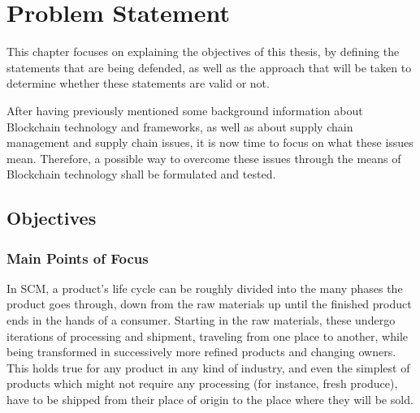 \chapter{Problem Statement}
\label{chap:supply-chain-problems}
\minitoc \mtcskip \noindent 

This chapter focuses on explaining the objectives of this thesis, by defining the statements that are being defended, as well as the approach that will be taken to determine whether these statements are valid or not.


After having previously mentioned some background information about Blockchain technology and frameworks, as well as about supply chain management and supply chain issues, it is now time to focus on what these issues mean. Therefore, a possible way to overcome these issues through the means of Blockchain technology shall be formulated and tested.

\section{Objectives}


\subsection{Main Points of Focus}
\label{sec:points-of-focus}
In SCM, a product's life cycle can be roughly divided into the many phases the product goes through, down from the raw materials up until the finished product ends in the hands of a consumer. Starting in the raw materials, these undergo iterations of processing and shipment, traveling from one place to another, while being transformed in successively more refined products  and changing owners. This holds true for any product in any kind of industry, and even the simplest of products which might not require any processing (for instance, fresh produce), have to be shipped from their place of origin to the place where they will be sold.


